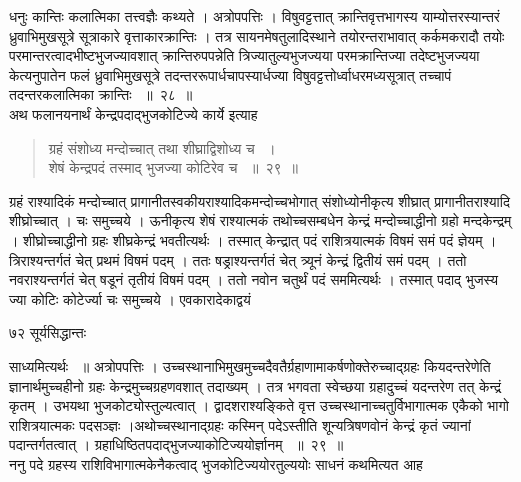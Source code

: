 \documentclass[11pt, openany]{book}
\begin{document}
\begin{sloppypar}
\noindent धनुः कान्तिः कलात्मिका तत्त्वज्ञैः कथ्यते । अत्रोपपत्तिः । विषुवट्टत्तात् क्रान्तिवृत्तभागस्य याम्योत्तरस्यान्तरं ध्रुवाभिमुखसूत्रे सूत्राकारे वृत्ताकारक्रान्तिः । तत्र सायनमेषतुलादिस्थाने तयोरन्तराभावात् कर्कमकरादौ तयोः परमान्तरत्वादभीष्टभुजज्यावशात् क्रान्तिरुपपन्नेति त्रिज्यातुल्यभुजज्यया परमक्रान्तिज्या तदेष्टभुजज्यया केत्यनुपातेन फलं ध्रुवाभिमुखसूत्रे तदन्तररूपार्धचापस्यार्धज्या विषुवट्टत्तोर्ध्वाधरमध्यसूत्रात् तच्चापं तदन्तरकलात्मिका क्रान्तिः ~॥~२८~॥\\
\noindent अथ फलानयनार्थं केन्द्रपदाद्भुजकोटिज्ये कार्ये इत्याह\textendash
\end{sloppypar}
\begin{quote}

{\ssi ग्रहं संशोध्य मन्दोच्चात् तथा शीघ्राद्विशोध्य च ~।\\
शेषं केन्द्रपदं तस्माद् भुजज्या कोटिरेव च ~॥~२९~॥}
\end{quote}
\begin{sloppypar}
ग्रहं राश्यादिकं मन्दोच्चात् प्रागानीतस्वकीयराश्यादिकमन्दोच्चभोगात् संशोध्योनीकृत्य शीघ्रात् प्रागानीतराश्यादि शीघ्रोच्चात् । चः समुच्चये । ऊनीकृत्य शेषं राश्यात्मकं तथोच्चसम्बधेन केन्द्रं मन्दोच्चाद्धीनो ग्रहो मन्दकेन्द्रम् । शीघ्रोच्चाद्धीनो ग्रहः शीघ्रकेन्द्रं भवतीत्यर्थः । तस्मात् केन्द्रात् पदं राशित्रयात्मकं विषमं समं पदं ज्ञेयम् । त्रिराश्यन्तर्गतं चेत् प्रथमं विषमं पदम् । ततः षड्राश्यन्तर्गतं चेत् त्र्यूनं केन्द्रं द्वितीयं समं पदम् । ततो नवराश्यन्तर्गतं चेत् षडूनं तृतीयं विषमं पदम् । ततो नवोन चतुर्थं पदं सममित्यर्थः । तस्मात् पदाद् भुजस्य ज्या कोटिः कोटेर्ज्या चः समुच्चये । एवकारादेकाद्वयं\textendash
\end{sloppypar}

\newpage

\noindent ७२ \hspace{4cm} सूर्यसिद्धान्तः
\vspace{1cm}

\begin{sloppypar}
\noindent साध्यमित्यर्थः ~॥ अत्रोपपत्तिः । उच्चस्थानाभिमुखमुच्चदैवतैर्ग्रहाणामाकर्षणोक्तेरुच्चाद्ग्रहः कियदन्तरेणेति ज्ञानार्थमुच्चहीनो ग्रहः केन्द्रमुच्चग्रहणवशात् तदाख्यम् । तत्र भगवता स्वेच्छया ग्रहादुच्चं यदन्तरेण तत् केन्द्रं कृतम् । उभयथा भुजकोट्योस्तुल्यत्वात् । द्वादशराश्यङ्किते वृत्त उच्चस्थानाच्चतुर्विभागात्मक एकैको भागो राशित्रयात्मकः पदसञ्ज्ञः ।अथोच्चस्थानाद्ग्रहः कस्मिन् पदेऽस्तीति शून्यत्रिषणवोनं केन्द्रं कृतं ज्यानां पदान्तर्गतत्वात् । ग्रहाधिष्ठितपदाद्भुजज्याकोटिज्ययोर्ज्ञानम् ~॥~२९~॥\\
\noindent ननु पदे ग्रहस्य राशिविभागात्मकेनैकत्वाद् भुजकोटिज्ययोरतुल्ययोः साधनं कथमित्यत आह \textendash
\end{sloppypar}
\end{document}
